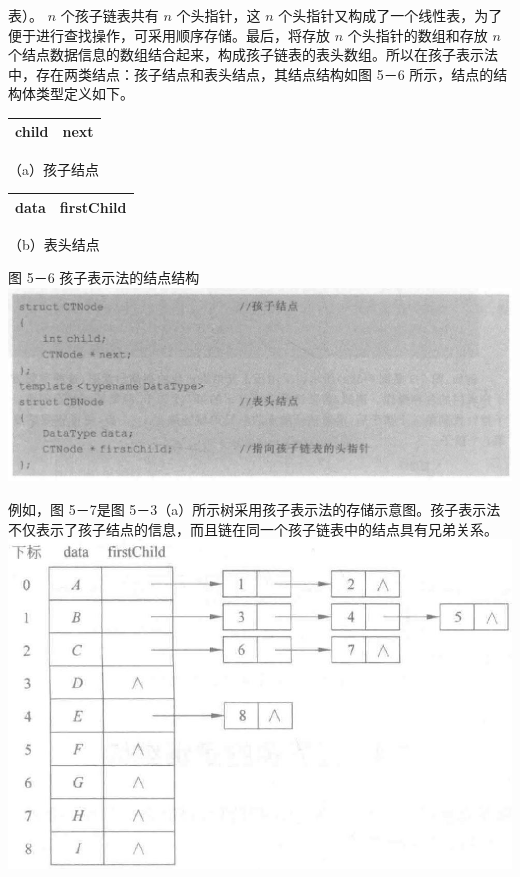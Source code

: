 \documentclass[10pt]{article}
\begin{document}
表）。 $n$ 个孩子链表共有 $n$ 个头指针，这 $n$ 个头指针又构成了一个线性表，为了便于进行查找操作，可采用顺序存储。最后，将存放 $n$ 个头指针的数组和存放 $n$ 个结点数据信息的数组结合起来，构成孩子链表的表头数组。所以在孩子表示法中，存在两类结点：孩子结点和表头结点，其结点结构如图 5－6 所示，结点的结构体类型定义如下。

\begin{center}
\begin{tabular}{|c|c|}
\hline
child & next \\
\hline
\end{tabular}
\end{center}

（a）孩子结点

\begin{center}
\begin{tabular}{|c|c|}
\hline
data & firstChild \\
\hline
\end{tabular}
\end{center}

（b）表头结点

图 5－6 孩子表示法的结点结构\\
\includegraphics[max width=\textwidth, center]{2025_06_06_704745ea57b15b2333e5g-146(1)}

例如，图 5－7是图 5－3（a）所示树采用孩子表示法的存储示意图。孩子表示法不仅表示了孩子结点的信息，而且链在同一个孩子链表中的结点具有兄弟关系。\\
\includegraphics[max width=\textwidth, center]{2025_06_06_704745ea57b15b2333e5g-146}
\end{document}
